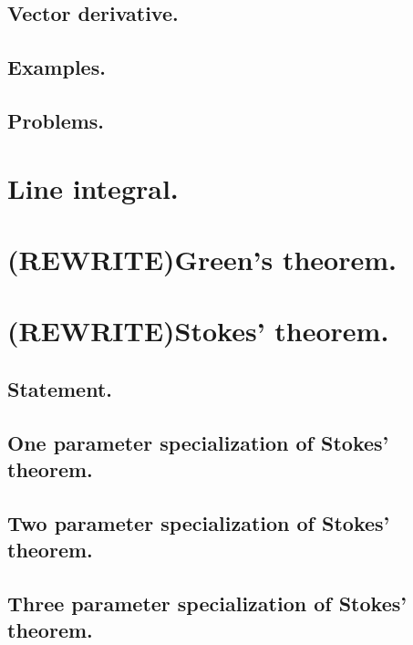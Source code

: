       \subsection{Vector derivative.}
         
      \subsection{Examples.}
         
      \subsection{Problems.}
         
         
         

   \section{Line integral.}
      
   \section{(REWRITE)Green's theorem.}
      
   \section{(REWRITE)Stokes' theorem.}
      \subsection{Statement.}
         
      \subsection{One parameter specialization of Stokes' theorem.}
         
      \subsection{Two parameter specialization of Stokes' theorem.}
         
      \subsection{Three parameter specialization of Stokes' theorem.}
         
